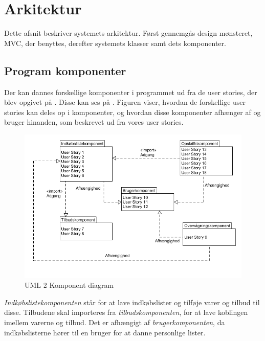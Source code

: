 \section{Arkitektur}
Dette afsnit beskriver systemets arkitektur.
Først gennemgås design mønsteret, MVC, der benyttes, derefter systemets klasser samt dets komponenter.



\subsection{Program komponenter}\label{subsec:komp}
Der kan dannes forskellige komponenter i programmet ud fra de user stories, der blev opgivet på .
Disse kan ses på .
Figuren viser, hvordan de forskellige user stories kan deles op i komponenter, og hvordan disse komponenter afhænger af og bruger hinanden, som beskrevet ud fra vores user stories.

\begin{figure}
	\vspace{-20pt}
	\begin{center}
		\includegraphics[scale=0.6]{images/Diagrams/Komponenter.png}
	\end{center}
	\vspace{-20pt}
	\caption{UML 2 Komponent diagram }\label{figure:komp}
	\vspace{-20pt}
\end{figure}

\textit{Indkøbslistekomponenten} står for at lave indkøbslister og tilføje varer og tilbud til disse.
Tilbudene skal importeres fra \textit{tilbudskomponenten}, for at lave koblingen imellem varerne og tilbud.
Det er afhængigt af \textit{brugerkomponenten}, da indkøbslisterne hører til en bruger for at danne personlige lister. 

